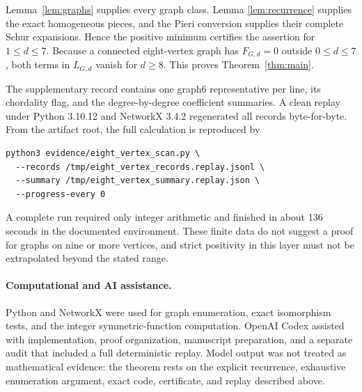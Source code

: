 \documentclass[11pt]{article}
\begin{document}
Lemma~\ref{lem:graphs} supplies every graph class.  Lemma
\ref{lem:recurrence} supplies the exact homogeneous pieces, and the Pieri
conversion supplies their complete Schur expansions.  Hence the positive
minimum certifies the assertion for $1\leq d\leq7$.  Because a connected
eight-vertex graph has $F_{G,d}=0$ outside $0\leq d\leq7$, both terms in
$L_{G,d}$ vanish for $d\geq8$.  This proves Theorem~\ref{thm:main}.

The supplementary record contains one graph6 representative per line, its
chordality flag, and the degree-by-degree coefficient summaries.  A clean
replay under Python 3.10.12 and NetworkX 3.4.2 regenerated all records
byte-for-byte.  From the artifact root, the full calculation is reproduced by
\begin{verbatim}
python3 evidence/eight_vertex_scan.py \
  --records /tmp/eight_vertex_records.replay.jsonl \
  --summary /tmp/eight_vertex_summary.replay.json \
  --progress-every 0
\end{verbatim}
A complete run required only integer arithmetic and finished in about 136
seconds in the documented environment.  These finite data do not suggest a
proof for graphs on nine or more vertices, and strict positivity in this layer
must not be extrapolated beyond the stated range.

\paragraph{Computational and AI assistance.}
Python and NetworkX were used for graph enumeration, exact isomorphism tests,
and the integer symmetric-function computation.  OpenAI Codex assisted with
implementation, proof organization, manuscript preparation, and a separate
audit that included a full deterministic replay.  Model output was not treated
as mathematical evidence: the theorem rests on the explicit recurrence,
exhaustive enumeration argument, exact code, certificate, and replay described
above.



\end{document}
